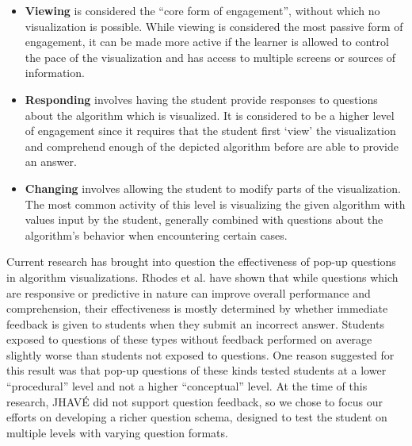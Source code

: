 \documentclass{acm_proc_article-sp}
\begin{document}
\begin{itemize}

\item \textbf{Viewing} is considered the ``core form of engagement'', without which no visualization is possible.
While viewing is considered the most passive form of engagement, it can be made more active if the learner is allowed to control the pace of the visualization and has access to multiple screens or sources of information.

\item \textbf{Responding} involves having the student provide responses to questions about the algorithm which is visualized.
It is considered to be a higher level of engagement since it requires that the student first `view' the visualization and comprehend enough of the depicted algorithm before are able to provide an answer.

\item \textbf{Changing} involves allowing the student to modify parts of the visualization.
The most common activity of this level is visualizing the given algorithm with values input by the student, generally combined with questions about the algorithm's behavior when encountering certain cases.

\end{itemize}

Current research has brought into question the effectiveness of pop-up questions in algorithm visualizations.
Rhodes et al.
have shown that while questions which are responsive or predictive in nature can improve overall performance and comprehension, their effectiveness is mostly determined by whether immediate feedback is given to students when they submit an incorrect answer.
Students exposed to questions of these types without feedback performed on average slightly worse than students not exposed to questions.
One reason suggested for this result was that pop-up questions of these kinds tested students at a lower ``procedural'' level and not a higher ``conceptual'' level.\cite{intquest}
At the time of this research, JHAVÉ did not support question feedback, so we chose to focus our efforts on developing a richer question schema, designed to test the student on multiple levels with varying question formats.
\end{document}
